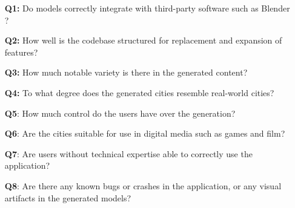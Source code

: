 \vspace{-0.5cm} %
\begin{itemize}
  \item[\textbf{Q1:}] Do models correctly integrate with third-party software such as Blender \cite{blender}?
  \item[\textbf{Q2:}] How well is the codebase structured for replacement and expansion of features?
  \item[\textbf{Q3:}] How much notable variety is there in the generated content?
  \item[\textbf{Q4:}] To what degree does the generated cities resemble real-world cities?
  \item[\textbf{Q5}:] How much control do the users have over the generation?
  \item[\textbf{Q6}:] Are the cities suitable for use in digital media such as games and film?
  \item[\textbf{Q7}:] Are users without technical expertise able to correctly use the application?
  \item[\textbf{Q8}:] Are there any known bugs or crashes in the application, or any visual artifacts in the generated models?
\end{itemize}
